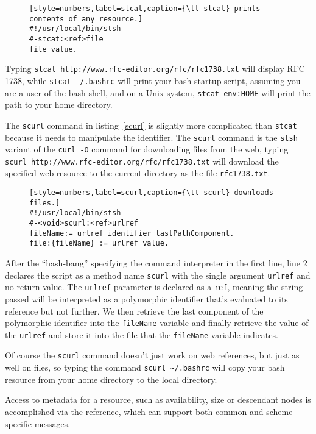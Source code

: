 \documentclass[preprint,authoryear]{acm_proc_article-sp}
\begin{document}
\begin{figure}[htbp]
\begin{lstlisting}[style=numbers,label=stcat,caption={\tt stcat} prints contents of any resource.]
#!/usr/local/bin/stsh
#-stcat:<ref>file
file value.
\end{lstlisting}
\end{figure}

Typing {\tt stcat http://www.rfc-editor.org/rfc/rfc1738.txt} will display RFC 1738, while 
{\tt stcat ~/.bashrc} will print your bash startup script, assuming you are a user of the
bash shell, and on a Unix system, {\tt stcat env:HOME} will print the path to 
your home directory.


The {\tt scurl} command in listing~\ref{scurl} is slightly more complicated than {\tt stcat} because
it needs to manipulate the identifier.  The {\tt scurl} command
is the {\tt stsh} variant of the {\tt curl -O} command for downloading files from the web, typing
{\tt scurl http://www.rfc-editor.org/rfc/rfc1738.txt} will download the specified web resource
to the current directory as the file {\tt rfc1738.txt}.

\begin{figure}[htbp]
\begin{lstlisting}[style=numbers,label=scurl,caption={\tt scurl} downloads files.]
#!/usr/local/bin/stsh
#-<void>scurl:<ref>urlref
fileName:= urlref identifier lastPathComponent.
file:{fileName} := urlref value.
\end{lstlisting}
\end{figure}

After the ``hash-bang'' specifying the command interpreter in the first line, line 2 declares
the script as a method name {\tt scurl} with the single argument {\tt urlref} and no return
value.  The {\tt urlref} parameter is declared as a {\tt ref}, meaning the string passed will
be interpreted as a polymorphic identifier that's evaluated to its reference but not further.
We then retrieve the last component of the polymorphic identifier into the {\tt fileName}
variable and finally retrieve the value of the {\tt urlref} and store it into the file that
the {\tt fileName} variable indicates.

Of course the {\tt scurl} command doesn't just work on web references, but just as well
on files, so typing the command {\tt scurl \~\//.bashrc} will copy your bash resource from your home directory
to the local directory.

Access to metadata for a resource, such as availability, size or descendant nodes
is accomplished via the reference, which can support both common and scheme-specific
messages.
\end{document}
